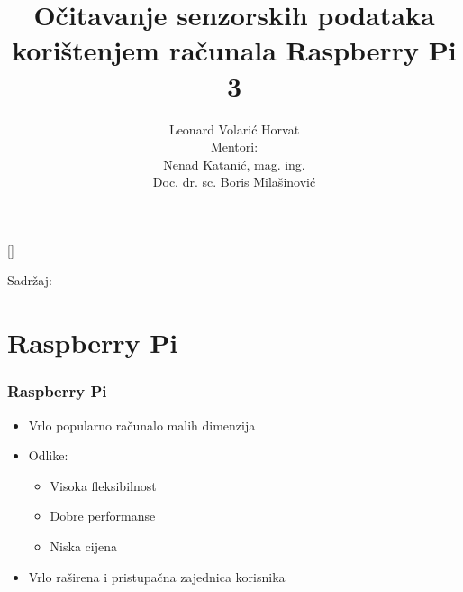 \documentclass[12pt]{beamer}
\date{}
\title{Očitavanje senzorskih podataka korištenjem računala Raspberry Pi 3}
\author{Leonard Volarić Horvat\\ Mentori: \\ Nenad Katanić, mag. ing.\\
Doc. dr. sc. Boris Milašinović}
\institute[FER]{Sveučilište u Zagrebu\\Fakultet elektrotehnike i računarstva}
\begin{document}
{
	\begin{frame}
		\maketitle
	\end{frame}
}

\begin{frame}
	Sadržaj:
	\tableofcontents
\end{frame}

\section{Raspberry Pi}
\begin{frame}
\frametitle{Raspberry Pi}
	\begin{itemize}
		\item Vrlo popularno računalo malih dimenzija
		\item Odlike:
		\begin{itemize}
			\item Visoka fleksibilnost
			\item Dobre performanse
			\item Niska cijena
		\end{itemize}
		\item Vrlo raširena i pristupačna zajednica korisnika
	\end{itemize}
\end{frame}
\end{document}
